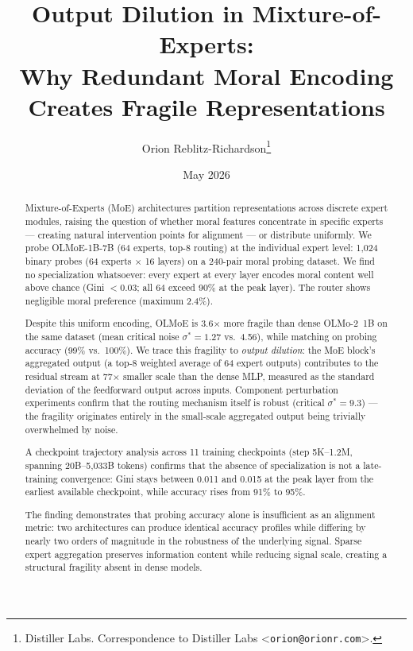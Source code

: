 \documentclass{article}
\title{Output Dilution in Mixture-of-Experts:\\
  Why Redundant Moral Encoding Creates Fragile Representations}
\author{%
  Orion Reblitz-Richardson\thanks{%
    Distiller Labs. Correspondence to Distiller Labs
    \textless\texttt{orion@orionr.com}\textgreater.}
}
\date{May 2026}
\begin{document}
\maketitle

\begin{abstract}
Mixture-of-Experts (MoE) architectures partition representations
across discrete expert modules, raising the question of whether
moral features concentrate in specific experts --- creating natural
intervention points for alignment --- or distribute uniformly. We
probe OLMoE-1B-7B (64 experts, top-8 routing) at the individual
expert level: 1,024 binary probes (64 experts $\times$ 16 layers)
on a 240-pair moral probing dataset. We find no specialization
whatsoever: every expert at every layer encodes moral content well
above chance (Gini $< 0.03$; all 64 exceed 90\% at the peak
layer). The router shows negligible moral preference (maximum
2.4\%).

Despite this uniform encoding, OLMoE is 3.6$\times$ more fragile
than dense OLMo-2~1B on the same dataset (mean critical noise
$\sigma^* = 1.27$ vs.\ 4.56), while matching on probing accuracy
(99\% vs.\ 100\%). We trace this fragility to \emph{output
dilution}: the MoE block's aggregated output (a top-8 weighted
average of 64 expert outputs) contributes to the residual stream at
77$\times$ smaller scale than the dense MLP, measured as the standard
deviation of the feedforward output across inputs. Component
perturbation experiments confirm that the routing mechanism itself is
robust (critical $\sigma^* = 9.3$) --- the fragility originates
entirely in the small-scale aggregated output being trivially
overwhelmed by noise.

A checkpoint trajectory analysis across 11 training checkpoints
(step 5K--1.2M, spanning 20B--5,033B tokens) confirms that the
absence of specialization is not a late-training convergence: Gini
stays between 0.011 and 0.015 at the peak layer from the earliest
available checkpoint, while accuracy rises from 91\% to 95\%.

The finding demonstrates that probing accuracy alone is insufficient
as an alignment metric: two architectures can produce identical
accuracy profiles while differing by nearly two orders of magnitude
in the robustness of the underlying signal. Sparse expert
aggregation preserves information content while reducing signal
scale, creating a structural fragility absent in dense models.
\end{abstract}







\end{document}
